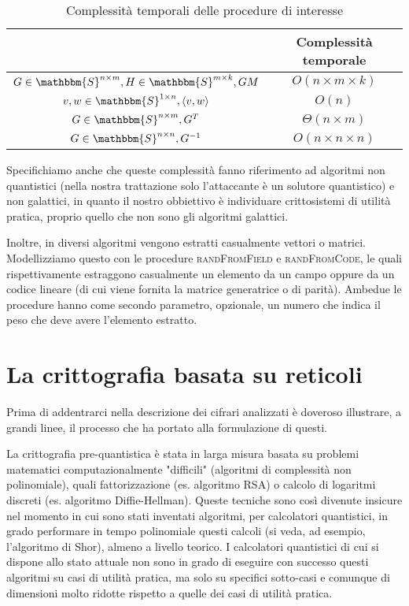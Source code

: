 \documentclass[12pt, a4paper]{report}
\theoremstyle{definition}
\begin{document}
			\begin{table}[H]
				\centering
				\begin{tabular}[t]{cc}
					\hline
					&Complessità temporale \\
					\hline
					$G\in\mathbbm{S}^{n\times m},H\in\mathbbm{S}^{m\times k}, GM$ & $O(n\times m\times k)$\\
					$v,w\in\mathbbm{S}^{1\times n},\langle v,w\rangle$ &$O(n)$\\
					$G\in\mathbbm{S}^{n\times m},G^T$ &$\Theta(n\times m)$\\
					$G\in\mathbbm{S}^{n\times n},G^{-1}$&$O(n\times n\times n)$\\
					\hline
				\end{tabular}
				\caption{Complessità temporali delle procedure di interesse}				
			\end{table}

			Specifichiamo anche che queste complessità fanno riferimento ad algoritmi non quantistici (nella nostra trattazione solo l'attaccante è un solutore quantistico) e non galattici, in quanto il nostro obbiettivo è individuare crittosistemi di utilità pratica, proprio quello che non sono gli algoritmi galattici.
			
			Inoltre, in diversi algoritmi vengono estratti casualmente vettori o matrici. Modellizziamo questo con le procedure \textsc{randFromField} e \textsc{randFromCode}, le quali rispettivamente estraggono casualmente un elemento da un campo oppure da un codice lineare (di cui viene fornita la matrice generatrice o di parità). Ambedue le procedure hanno come secondo parametro, opzionale, un numero che indica il peso che deve avere l'elemento estratto.
			
	\chapter{La crittografia basata su reticoli \cite{12} \cite{14}}
		Prima di addentrarci nella descrizione dei cifrari analizzati è doveroso illustrare, a grandi linee, il processo che ha portato alla formulazione di questi.
		
		La crittografia pre-quantistica è stata in larga misura basata su problemi matematici computazionalmente "difficili" (algoritmi di complessità non polinomiale), quali fattorizzazione (es. algoritmo RSA) o calcolo di logaritmi discreti (es. algoritmo Diffie-Hellman). Queste tecniche sono così divenute insicure nel momento in cui sono stati inventati algoritmi, per calcolatori quantistici, in grado performare in tempo polinomiale questi calcoli (si veda, ad esempio, l'algoritmo di Shor), almeno a livello teorico. I calcolatori quantistici di cui si dispone allo stato attuale non sono in grado di eseguire con successo questi algoritmi su casi di utilità pratica, ma solo su specifici sotto-casi e comunque di dimensioni molto ridotte rispetto a quelle dei casi di utilità pratica.
		
\end{document}
